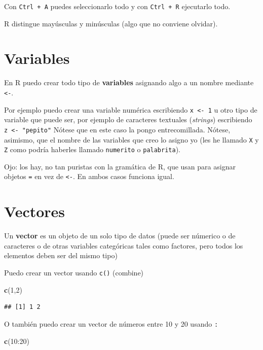 \documentclass[]{book}
\newenvironment{Shaded}{\begin{snugshade}}{\end{snugshade}}
\newcommand{\KeywordTok}[1]{\textcolor[rgb]{0.13,0.29,0.53}{\textbf{{#1}}}}
\newcommand{\DecValTok}[1]{\textcolor[rgb]{0.00,0.00,0.81}{{#1}}}
\newcommand{\NormalTok}[1]{{#1}}
\theoremstyle{definition}
\theoremstyle{definition}
\theoremstyle{remark}
\begin{document}
Con \texttt{Ctrl\ +\ A} puedes seleccionarlo todo y con
\texttt{Ctrl\ +\ R} ejecutarlo todo.

R distingue mayúsculas y minúsculas (algo que no conviene olvidar).

\section{Variables}\label{variables}

En R puedo crear todo tipo de \textbf{variables} asignando algo a un
nombre mediante \texttt{\textless{}-}.

Por ejemplo puedo crear una variable numérica escribiendo
\texttt{x\ \textless{}-\ 1} u otro tipo de variable que puede ser, por
ejemplo de caracteres textuales (\emph{strings}) escribiendo
\texttt{z\ \textless{}-\ "pepito"} Nótese que en este caso la pongo
entrecomillada. Nótese, asimismo, que el nombre de las variables que
creo lo asigno yo (les he llamado \texttt{X} y \texttt{Z} como podría
haberles llamado \texttt{numerito} o \texttt{palabrita}).

Ojo: los hay, no tan puristas con la gramática de R, que usan para
asignar objetos \texttt{=} en vez de \texttt{\textless{}-}. En ambos
casos funciona igual.

\section{Vectores}\label{vectores}

Un \textbf{vector} es un objeto de un solo tipo de datos (puede ser
númerico o de caracteres o de otras variables categóricas tales como
factores, pero todos los elementos deben ser del mismo tipo)

Puedo crear un vector usando \texttt{c()} (combine)

\begin{Shaded}
\begin{Highlighting}[]
\KeywordTok{c}\NormalTok{(}\DecValTok{1}\NormalTok{,}\DecValTok{2}\NormalTok{)}
\end{Highlighting}
\end{Shaded}

\begin{verbatim}
## [1] 1 2
\end{verbatim}

O también puedo crear un vector de números entre 10 y 20 usando
\texttt{:}

\begin{Shaded}
\begin{Highlighting}[]
\KeywordTok{c}\NormalTok{(}\DecValTok{10}\NormalTok{:}\DecValTok{20}\NormalTok{)}
\end{Highlighting}
\end{Shaded}
\end{document}
